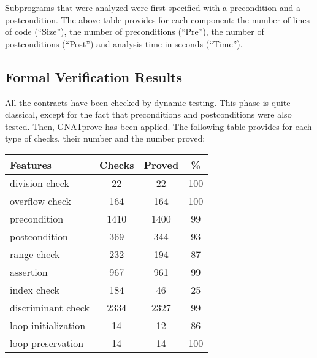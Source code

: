 \documentclass[10pt,a4paper,twocolumn]{article}
\newcommand{\gnatprove}{GNATprove\xspace}
\begin{document}
Subprograms that were analyzed were first specified with a precondition and a
postcondition. The above table provides for each
component: the number of lines of code (``Size''), the number of preconditions
(``Pre''), the number of postconditions (``Post'') and analysis time
in seconds (``Time'').

\subsection{Formal Verification Results}

All the contracts have been checked by dynamic testing. This phase is
quite classical, except for the fact that preconditions and
postconditions were also tested. Then, \gnatprove has been
applied. The following table provides for each type of checks, their
number and the number proved:


\begin{tabular}{|l|c|c|c|}
\hline
{\bf Features}            & {\bf Checks} & {\bf Proved} & {\bf \%}  \\
\hline
division check      & 22     & 22     & 100 \\
\hline
overflow check      & 164    & 164    & 100 \\
\hline
precondition        & 1410   & 1400   & 99  \\
\hline
postcondition       & 369    & 344    & 93  \\
\hline
range check         & 232    & 194    & 87  \\
\hline
assertion           & 967    & 961    & 99  \\
\hline
index check         & 184    & 46     & 25  \\
\hline
discriminant check  & 2334   & 2327   & 99  \\
\hline
loop initialization & 14     & 12     & 86  \\
\hline
loop  preservation  & 14     & 14     & 100 \\
\hline
\end{tabular}

\end{document}
